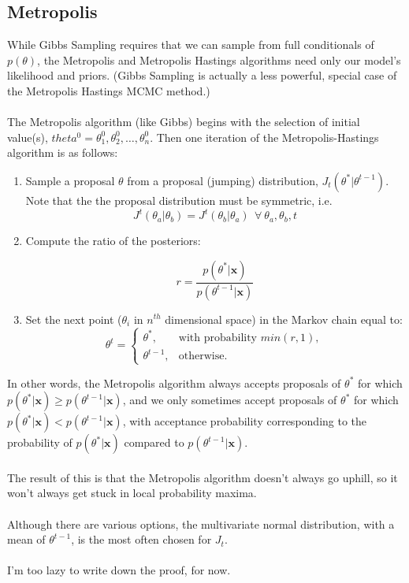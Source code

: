 \documentclass[12pt]{book}
\begin{document}
	\subsection{Metropolis} 
	While Gibbs Sampling requires that we can sample from full conditionals of $p(\theta)$, the Metropolis and Metropolis Hastings algorithms need only our model's likelihood and priors. (Gibbs Sampling is actually a less powerful, special case of the Metropolis Hastings MCMC method.) 
	\\\\
	The Metropolis algorithm (like Gibbs) begins with the selection of initial value(s), $theta^0 = \theta^0_1, \theta^0_2,\dots, \theta^0_n$. Then one iteration of the Metropolis-Hastings algorithm is as follows:
	\begin{enumerate}
	\item Sample a proposal $\theta$ from a proposal (jumping) distribution, $J_t(\theta^*|\theta^{t-1})$. Note that the the proposal distribution must be symmetric, i.e.
	\begin{equation}
	 J^t(\theta_a|\theta_b) = J^t(\theta_b|\theta_a) \ \ \forall \ \theta_a, \theta_b, t
	 \end{equation}
	 
	\item Compute the ratio of the posteriors:
	
		\begin{equation}
			r = \frac{p(\theta^*|\textbf{x})}{p(\theta^{t-1}|\textbf{x})}
		\end{equation}
	
	\item Set the next point ($\theta_i$ in $n^{th}$ dimensional space) in the Markov chain equal to:
		\begin{equation}
\theta^t = \begin{cases}
  \theta^*, & \text{with probability $min(r, 1)$}, \\
  \theta^{t-1}, & \text{otherwise}.
\end{cases}
	    \end{equation}
	\end{enumerate}
	In other words, the Metropolis algorithm always accepts proposals of $\theta^*$ for which $p(\theta^*|\textbf{x}) \geq p(\theta^{t-1}|\textbf{x})$, and we only sometimes accept proposals of $\theta^*$ for which $p(\theta^*|\textbf{x}) < p(\theta^{t-1}|\textbf{x})$, with acceptance probability corresponding to the probability of $p(\theta^*|\textbf{x})$ compared to $p(\theta^{t-1}|\textbf{x})$.
	\\\\
	The result of this is that the Metropolis algorithm doesn't always go uphill, so it won't always get stuck in local probability maxima.
	\\\\
	Although there are various options, the multivariate normal distribution, with a mean of $\theta^{t-1}$, is the most often chosen for $J_t$.
	\\\\
	I'm too lazy to write down the proof, for now.
	
\end{document}

